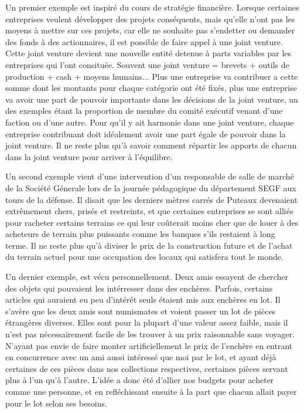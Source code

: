 \documentclass[12pt,twoside,a4paper]{article}
\begin{document}
Un premier exemple est inspir\'e du cours de strat\'egie financi\`ere. Lorsque certaines entreprises veulent d\'evelopper des projets cons\'equents, mais qu'elle n'ont pas les moyens \`a mettre sur ces projets, car elle ne souhaite pas s'endetter ou demander des fonds à des actionnaires, il est possible de faire appel \`a une joint venture. Cette joint venture devient une nouvelle entit\'e detenue \`a parts variables par les entreprises qui l'ont consitu\'ee. Souvent une joint venture = brevets + outils de production + cash + moyens humains... Plus une entreprise va contribuer a cette somme dont les montants pour chaque cat\'egorie ont \'et\'e fix\'es, plus une entreprise va avoir une part de pouvoir importante dans les d\'ecisions de la joint venture, un des exemples \'etant la proportion de membre du comit\'e ex\'ecutif venant d'une faction ou d'une autre. 
Pour qu'il y ait harmonie dans une joint venture, chaque entreprise contribuant doit id\'ealement avoir une part \'egale de pouvoir dans la joint venture. Il ne reste plus qu'\`a savoir comment r\'epartir les apports de chacun dans la joint venture pour arriver \`a l'\'equilibre.

Un second exemple vient d'une intervention d'un responsable de salle de march\'e de la Soci\'et\'e G\'enerale lors de la journ\'ee p\'edagogique du d\'epartement SEGF aux tours de la d\'efense. Il disait que les derniers m\`etres carr\'es de Puteaux devenaient extr\^{e}mement chers, pris\'es et restreints, et que certaines entreprises se sont alli\'es pour racheter certains terrains ce qui leur co\^{u}terait moins cher que de louer \`a des acheteurs de terrain plus puissants comme les banques s'ils restaient \`a long terme. Il ne reste plus qu'\`a diviser le prix de la construction future et de l'achat du terrain actuel pour une occupation des locaux qui satisfera tout le monde.

Un dernier exemple, est v\'ecu personnellement. Deux amis essayent de chercher des objets qui pouvaient les int\'erresser dans des ench\`eres. Parfois, certains articles qui auraient eu peu d'intérêt seuls étaient mis aux enchères en lot. Il s'av\`ere que les deux amis sont numismates et voient passer un lot de pi\`eces \'etrang\`eres diverses. Elles sont pour la plupart d'une valeur assez faible, mais il n'est pas n\'ecessairement facile de les trouver \`a un prix raisonnable sans voyager. N'ayant pas envie de faire monter artificiellement le prix de l'ench\`ere en entrant en concurrence avec un ami aussi int\'eress\'e que moi par le lot, et ayant déjà certaines de ces pi\`eces dans nos collections respectives, certaines pi\`eces servant plus \`a l'un qu'\`a l'autre. L'id\'ee a donc été d'allier nos budgets pour acheter comme une personne, et en refl\'echissant ensuite \`a la part que chacun allait payer pour le lot selon ses besoins.
\end{document}
